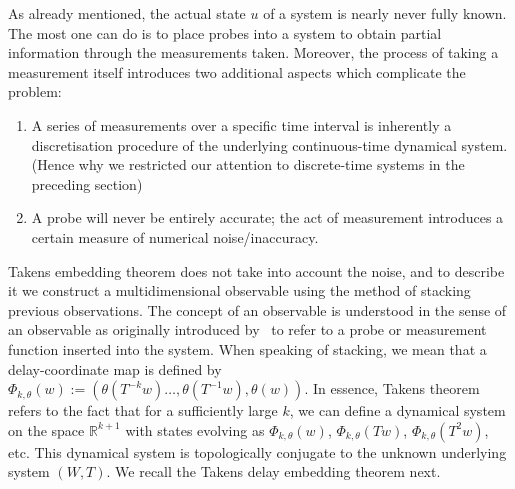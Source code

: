 
As already mentioned, the actual state $u$ of a system is nearly never fully known. The most one can do is to place probes into a system to obtain partial information through the measurements taken. Moreover, the process of taking a measurement itself introduces two additional aspects which complicate the problem:
\vspace{-6mm}
\begin{enumerate}[noitemsep, label=\roman*.]
  \item A series of measurements over a specific time interval is inherently a discretisation procedure of the underlying continuous-time dynamical system. (Hence why we restricted our attention to discrete-time systems in the preceding section)
  \item A probe will never be entirely accurate; the act of measurement introduces a certain measure of numerical noise/inaccuracy.
\end{enumerate}

Takens embedding theorem does not take into account the noise, and to describe it we construct a multidimensional observable using the method of stacking previous observations.
The concept of an observable is understood in the sense of an observable as originally introduced by~\cite{takens1981detecting, genericObservableAeyels} to refer to a probe or measurement function inserted into the system. 
When speaking of stacking, we mean that a delay-coordinate map is defined by
$\Phi_{k,\theta}(w) := (\theta(T^{-k}w)\ldots,\theta(T^{-1}w),\theta(w))$.  
In essence, Takens theorem refers to the fact that for a sufficiently large $k$, we can define a dynamical system on the space $\mathbb{R}^{k+1}$ with states evolving as $\Phi_{k,\theta}(w)$, $\Phi_{k,\theta}(Tw)$, $\Phi_{k,\theta}(T^2w)$, etc. This dynamical system is topologically conjugate to the unknown underlying system $(W,T)$. We recall the Takens delay embedding theorem next.



